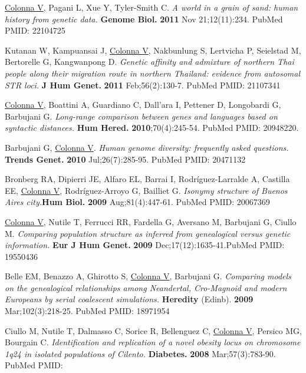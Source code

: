 \documentclass[openany]{book}
\begin{document}
\begin{enumerate}
    {\color{blue}\item \underline{Colonna V}, Pagani L, Xue Y, Tyler-Smith C.\textit{ A world in a grain of sand: human history from genetic data.}\textbf{ Genome Biol.} \textbf{2011} Nov 21;12(11):234. PubMed PMID: 22104725}

    \item Kutanan W, Kampuansai J, \underline{Colonna V}, Nakbunlung S, Lertvicha P, Seielstad M, Bertorelle G, Kangwanpong D. \textit{Genetic affinity and admixture of northern Thai people along their migration route in northern Thailand: evidence from autosomal STR loci.} \textbf{ J Hum Genet.} \textbf{2011} Feb;56(2):130-7. PubMed PMID: 21107341

    {\color{blue}\item \underline{Colonna V}, Boattini A, Guardiano C, Dall'ara I, Pettener D, Longobardi G, Barbujani G. \textit{Long-range comparison between genes and languages based on syntactic distances.}\textbf{ Hum Hered.} \textbf{2010};70(4):245-54. PubMed PMID: 20948220.}

    \item Barbujani G, \underline{Colonna V}. \textit{Human genome diversity: frequently asked questions.} \textbf{Trends Genet.} \textbf{2010} Jul;26(7):285-95. PubMed PMID: 20471132

    \item Bronberg RA, Dipierri JE, Alfaro EL, Barrai I, Rodríguez-Larralde A, Castilla EE, \underline{Colonna V}, Rodríguez-Arroyo G, Bailliet G. \textit{Isonymy structure of Buenos Aires city.}\textbf{Hum Biol.} \textbf{2009} Aug;81(4):447-61. PubMed PMID: 20067369

    {\color{blue}\item \underline{Colonna V}, Nutile T, Ferrucci RR, Fardella G, Aversano M, Barbujani G, Ciullo M. \textit{Comparing population structure as inferred from genealogical versus genetic information.} \textbf{ Eur J Hum Genet.} \textbf{2009} Dec;17(12):1635-41.PubMed PMID: 19550436}

    \item Belle EM, Benazzo A, Ghirotto S, \underline{Colonna V}, Barbujani G. \textit{Comparing models on the genealogical relationships among Neandertal, Cro-Magnoid and modern Europeans by serial coalescent simulations.}\textbf{  Heredity }(Edinb). \textbf{2009} Mar;102(3):218-25. PubMed PMID: 18971954

    \item Ciullo M, Nutile T, Dalmasso C, Sorice R, Bellenguez C, \underline{Colonna V}, Persico MG, Bourgain C. \textit{Identification and replication of a novel obesity locus on chromosome 1q24 in isolated populations of Cilento.}\textbf{ Diabetes.} \textbf{2008} Mar;57(3):783-90. PubMed PMID:
    

\end{enumerate}
\end{document}
